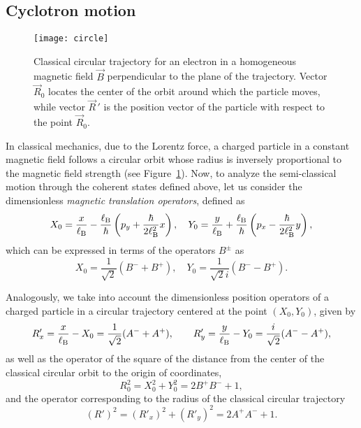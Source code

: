 \documentclass[aps,showpacs,showkeys]{revtex4}
\begin{document}
\subsection{Cyclotron motion}

	
	\begin{figure}[htb]
	\centering
	\texttt{[image: circle]}
	\caption{\label{fig:circle} Classical circular trajectory for an electron in a homogeneous magnetic field $\vec{B}$ perpendicular to the plane of the trajectory. Vector $\vec{R}_{0}$ locates the center of the orbit around which the particle moves,  while vector $\vec{R}\,'$ is the position vector of the particle with respect to the point $\vec{R}_{0}$.}
\end{figure}

In classical mechanics, due to the Lorentz force, a charged particle in a constant magnetic field follows a circular orbit whose radius is inversely proportional to the magnetic field strength (see Figure~\ref{fig:circle}). Now, to analyze the semi-classical motion through the coherent states defined above, let us consider the dimensionless {\it magnetic translation operators}, defined as \cite{z64,b64,l83}
\begin{equation}
	X_{0}=\frac{x}{\ell_{\rm B}}-\frac{\ell_{\rm B}}{\hbar}\left(p_y + \frac{\hbar}{2\ell_{\rm B}^{2}}x\right), 
	\quad 
	Y_{0}=\frac{y}{\ell_{\rm B}}+\frac{\ell_{\rm B}}{\hbar}\left(p_x - \frac{\hbar}{2\ell_{\rm B}^{2}}y\right),
\end{equation}
which can be expressed in terms of the operators $B^{\pm}$ as
\begin{equation}\label{magneticoperators}
	X_{0}   =\frac{1}{\sqrt{2}}(B^{-}+B^{+}), \quad 
	Y_{0}   =\frac{1}{\sqrt{2}i}(B^{-}-B^{+}).
\end{equation}

Analogously, we take into account the dimensionless position operators of a charged particle in a circular trajectory centered at the point $(X_{0},Y_{0})$, given by  
	\begin{equation}\label{positionoperators}
		R'_x=\frac{x}{\ell_{\rm B}} -X_{0}=\frac{1}{\sqrt{2}}(A^{-}+A^{+}), \qquad 
		R'_y=\frac{y}{\ell_{\rm B}}-Y_{0}=\frac{i}{\sqrt{2}}(A^{-}-A^{+}),
	\end{equation}
as well as the operator of the square of the distance from the center of the classical circular orbit to the origin of coordinates,	\begin{equation}\label{squaredistance}
		R_{0}^{2}=X_{0}^{2}+Y_{0}^{2}=2B^{+}B^{-}+1,
	\end{equation}
and the operator corresponding to the radius of the classical circular trajectory
	\begin{equation}\label{classicaltrajectory}
		(R')^{2}=(R'_x)^{2}+(R'_y)^{2}=2A^{+}A^{-}+1.
	\end{equation}
	
\end{document}
